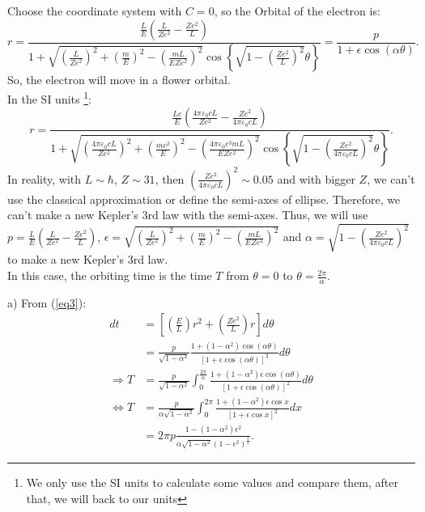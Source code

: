 \documentclass[12pt]{article}
\begin{document}
\noindent Choose the coordinate system with $C=0$, so the Orbital of the electron is:
$$ r = \frac{ \frac{L}{E} \left( \frac{L}{Ze^2} - \frac{Z e^2}{L} \right) }{ 1 + \sqrt{ \left( \frac{L}{Z e^2} \right)^2 + \left( \frac{m}{E} \right)^2 - \left( \frac{m L}{ E Z e^2} \right)^2 } \cos \left\{ \sqrt{ 1 - \left( \frac{ Z e^2}{L} \right)^2 } \theta \right\}} = \frac{p}{1 + \epsilon \cos \left( \alpha \theta \right) } .$$
\noindent So, the electron will move in a flower orbital. \\
\noindent In the SI units \footnote{We only use the SI units to calculate some values and compare them, after that, we will back to our units}:
$$ r = \frac{ \frac{Lc}{E} \left( \frac{ 4 \pi \varepsilon_0 cL}{Ze^2} - \frac{Z e^2}{ 4 \pi \varepsilon_0 c L} \right) }{ 1 + \sqrt{ \left( \frac{4 \pi \varepsilon_0 cL}{Z e^2} \right)^2 + \left( \frac{m c^2}{E} \right)^2 - \left( \frac{ 4 \pi \varepsilon_0 c^3 m L}{ E Z e^2} \right)^2 } \cos \left\{ \sqrt{ 1 - \left( \frac{ Z e^2}{ 4 \pi \varepsilon_0 c L} \right)^2 } \theta \right\}} .$$
\noindent In reality, with $L \sim \hbar$, $Z \sim 31$, then $ \left( \frac{ Z e^2}{ 4 \pi \varepsilon_0 c L} \right)^2 \sim 0.05$ and with bigger $Z$, we can't use the classical approximation or define the semi-axes of ellipse. Therefore, we can't make a new Kepler's 3rd law with the semi-axes. Thus, we will use $ p = \frac{L}{E} \left( \frac{L}{Ze^2} - \frac{Z e^2}{L} \right) $, $ \epsilon =  \sqrt{ \left( \frac{L}{Z e^2} \right)^2 + \left( \frac{m}{E} \right)^2 - \left( \frac{m L}{ E Z e^2} \right)^2 } $ and $ \alpha = \sqrt{ 1 - \left( \frac{ Z e^2}{ 4 \pi \varepsilon_0 c L} \right)^2 }$ to make a new Kepler's 3rd law. \\
\noindent In this case, the orbiting time is the time $T$ from $\theta=0$ to $\theta = \frac{2 \pi}{\alpha}$.

a) From (\ref{eq3}):
\begin{align*}
	dt & = \left[ \left( \frac{E}{L} \right) r^2 + \left( \frac{Z e^2}{L} \right) r \right] d \theta \\
	& = \frac{p}{\sqrt{ 1 - \alpha^2 }} \frac{ 1 + \left( 1 - \alpha^2 \right) \cos \left( \alpha \theta \right) }{ \left[ 1 + \epsilon \cos \left( \alpha \theta \right) \right]^2} d \theta \\
	\Rightarrow T & = \frac{p}{\sqrt{ 1 - \alpha^2 }} \int_0^{\frac{2 \pi}{\alpha}} \frac{ 1 + \left( 1 - \alpha^2 \right) \epsilon \cos \left( \alpha \theta \right) }{ \left[ 1 + \epsilon \cos \left( \alpha \theta \right) \right]^2} d \theta \\
	\Leftrightarrow T & = \frac{p}{\alpha \sqrt{ 1 - \alpha^2}} \int_0^{2 \pi} \frac{ 1 + \left( 1 - \alpha^2 \right) \epsilon \cos x }{ \left[ 1 + \epsilon \cos x \right]^2 } dx \\
	& = 2 \pi p \frac{ 1 - \left( 1 - \alpha^2 \right) \epsilon^2 }{\alpha \sqrt{1 - \alpha^2} \left( 1 - \epsilon^2 \right)^{\frac{3}{2}} } .
\end{align*}	
\end{document}
